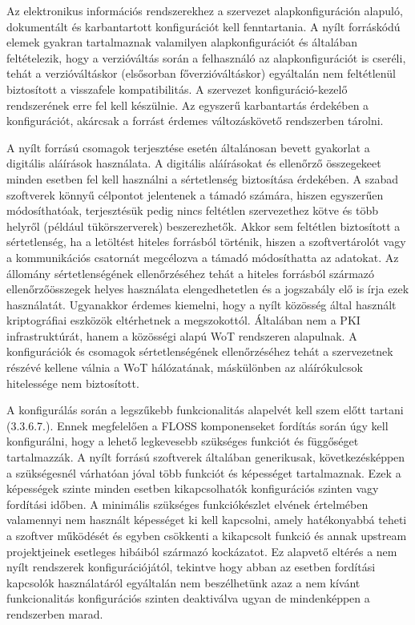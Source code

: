 \documentclass[12pt,magyar,a4paper,oneside]{scrreprt}
\begin{document}
Az elektronikus információs rendszerekhez a szervezet alapkonfiguráción
alapuló, dokumentált és karbantartott konfigurációt kell fenntartania. A
nyílt forráskódú elemek gyakran tartalmaznak valamilyen
alapkonfigurációt és általában feltételezik, hogy a verzióváltás során a
felhasználó az alapkonfigurációt is cseréli, tehát a verzióváltáskor
(elsősorban főverzióváltáskor) egyáltalán nem feltétlenül biztosított a
visszafele kompatibilitás. A szervezet konfiguráció-kezelő rendszerének
erre fel kell készülnie. Az egyszerű karbantartás érdekében a
konfigurációt, akárcsak a forrást érdemes változáskövető rendszerben
tárolni.

A nyílt forrású csomagok terjesztése esetén általánosan bevett gyakorlat
a digitális aláírások használata. A digitális aláírásokat és ellenőrző
összegekeet minden esetben fel kell használni a sértetlenség biztosítása
érdekében. A szabad szoftverek könnyű célpontot jelentenek a támadó
számára, hiszen egyszerűen módosíthatóak, terjesztésük pedig nincs
feltétlen szervezethez kötve és több helyről (például tükörszerverek)
beszerezhetők. Akkor sem feltétlen biztosított a sértetlenség, ha a
letöltést hiteles forrásból történik, hiszen a szoftvertárolót vagy a
kommunikációs csatornát megcélozva a támadó módosíthatta az adatokat. Az
állomány sértetlenségének ellenőrzéséhez tehát a hiteles forrásból
származó ellenőrzőösszegek helyes használata elengedhetetlen és a
jogszabály elő is írja ezek használatát. Ugyanakkor érdemes kiemelni,
hogy a nyílt közösség által használt kriptográfiai eszközök eltérhetnek
a megszokottól. Általában nem a PKI infrastruktúrát, hanem a közösségi
alapú WoT rendszeren alapulnak. A konfigurációk és csomagok
sértetlenségének ellenőrzéséhez tehát a szervezetnek részévé kellene
válnia a WoT hálózatának, máskülönben az aláírókulcsok hitelessége nem
biztosított.

A konfigurálás során a legszűkebb funkcionalitás alapelvét kell szem
előtt tartani (3.3.6.7.). Ennek megfelelően a FLOSS komponenseket
fordítás során úgy kell konfigurálni, hogy a lehető legkevesebb
szükséges funkciót és függőséget tartalmazzák. A nyílt forrású
szoftverek általában generikusak, következésképpen a szükségesnél
várhatóan jóval több funkciót és képességet tartalmaznak. Ezek a
képességek szinte minden esetben kikapcsolhatók konfigurációs szinten
vagy fordítási időben. A minimális szükséges funkciókészlet elvének
értelmében valamennyi nem használt képességet ki kell kapcsolni, amely
hatékonyabbá teheti a szoftver működését és egyben csökkenti a
kikapcsolt funkció és annak upstream projektjeinek esetleges hibáiból
származó kockázatot. Ez alapvető eltérés a nem nyílt rendszerek
konfigurációjától, tekintve hogy abban az esetben fordítási kapcsolók
használatáról egyáltalán nem beszélhetünk azaz a nem kívánt
funkcionalitás konfigurációs szinten deaktiválva ugyan de mindenképpen a
rendszerben marad.
\end{document}
